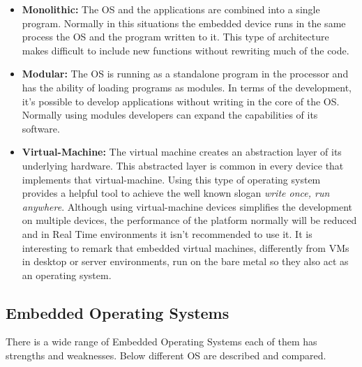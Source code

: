 \begin{itemize}
\item \textbf{Monolithic:} The OS and the applications are combined into a single program. Normally in this situations the embedded device runs in the same process the OS and the program written to it. This type of architecture makes difficult to include new functions without rewriting much of the code.

\item \textbf{Modular:} The OS is running as a standalone program in the processor and has the ability of loading programs as modules. In terms of the development, it's possible to develop applications without writing in the core of the OS. Normally using modules developers can expand the capabilities of its software.

\item \textbf{Virtual-Machine:} The virtual machine creates an abstraction layer of its underlying hardware. This abstracted layer is common in every device that implements that virtual-machine. Using this type of operating system provides a helpful tool to achieve the well known slogan \textit{write once, run anywhere}. Although using virtual-machine devices simplifies the development on multiple devices, the performance of the platform normally will be reduced and in Real Time environments it isn't recommended to use it. It is interesting to remark that embedded virtual machines, differently from VMs in desktop or server environments, run on the bare metal so they also act as an operating system.
\end{itemize}

\subsection{Embedded Operating Systems}\label{SOTA-Embedded-Operating-Systems}
There is a wide range of Embedded Operating Systems each of them has strengths and weaknesses. Below different OS are described and compared.
 
